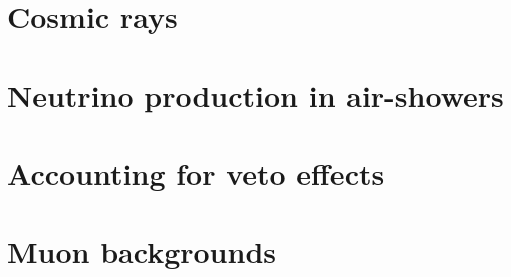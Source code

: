 \section{Cosmic rays}

\section{Neutrino production in air-showers}

\section{Accounting for veto effects}

\section{Muon backgrounds}
